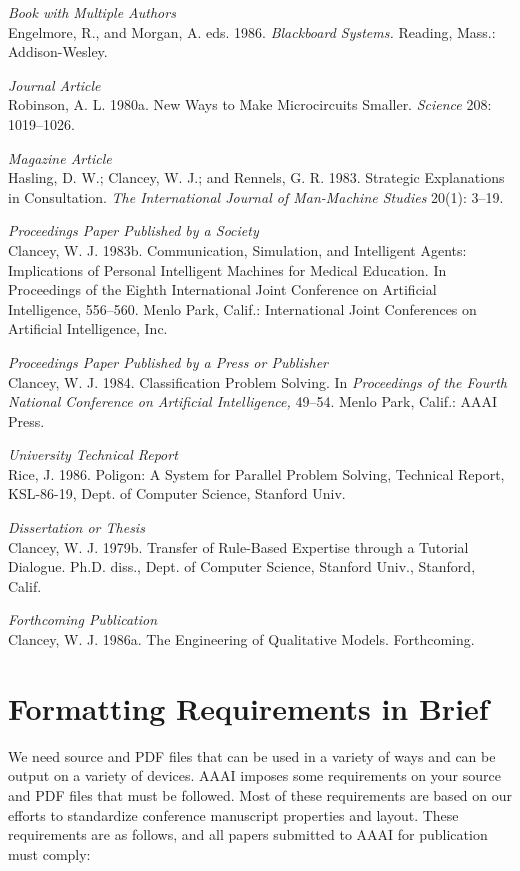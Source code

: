 \documentclass[letterpaper]{article}
\begin{document}
\smallskip \noindent \textit{Book with Multiple Authors}\\
Engelmore, R., and Morgan, A. eds. 1986. \textit{Blackboard Systems.} Reading, Mass.: Addison-Wesley.

\smallskip \noindent \textit{Journal Article}\\
Robinson, A. L. 1980a. New Ways to Make Microcircuits Smaller. \textit{Science} 208: 1019--1026.

\smallskip \noindent \textit{Magazine Article}\\
Hasling, D. W.; Clancey, W. J.; and Rennels, G. R. 1983. Strategic Explanations in Consultation. \textit{The International Journal of Man-Machine Studies} 20(1): 3--19.

\smallskip \noindent \textit{Proceedings Paper Published by a Society}\\
Clancey, W. J. 1983b. Communication, Simulation, and Intelligent Agents: Implications of Personal Intelligent Machines for Medical Education. In Proceedings of the Eighth International Joint Conference on Artificial Intelligence, 556--560. Menlo Park, Calif.: International Joint Conferences on Artificial Intelligence, Inc.

\smallskip \noindent \textit{Proceedings Paper Published by a Press or Publisher}\\
Clancey, W. J. 1984. Classification Problem Solving. In \textit{Proceedings of the Fourth National Conference on Artificial Intelligence,} 49--54. Menlo Park, Calif.: AAAI Press. 

\smallskip \noindent \textit{University Technical Report}\\
Rice, J. 1986. Poligon: A System for Parallel Problem Solving, Technical Report, KSL-86-19, Dept. of Computer Science, Stanford Univ. 

\smallskip \noindent \textit{Dissertation or Thesis}\\
Clancey, W. J. 1979b. Transfer of Rule-Based Expertise through a Tutorial Dialogue. Ph.D. diss., Dept. of Computer Science, Stanford Univ., Stanford, Calif.

\smallskip \noindent \textit{Forthcoming Publication}\\
Clancey, W. J. 1986a. The Engineering of Qualitative Models. Forthcoming.


\section{Formatting Requirements in Brief}
We need source and PDF files that can be used in a variety of ways and can be output on a variety of devices. AAAI imposes some requirements on your source and PDF files that must be followed. Most of these requirements are based on our efforts to standardize conference manuscript properties and layout. These requirements are as follows, and all papers submitted to AAAI for publication must comply:
\end{document}
